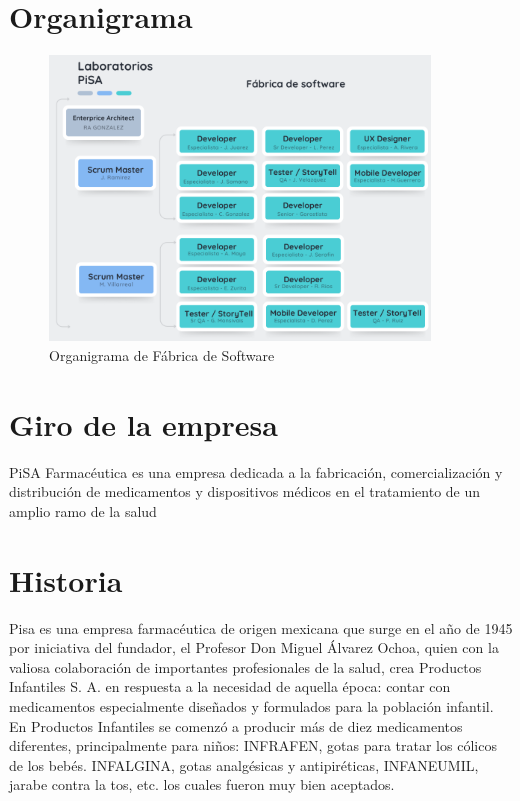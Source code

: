 \documentclass[12pt,letterpaper,spanish, xcolor=table]{report}
\numberwithin{figure}{subsection}
\begin{document}
\section{Organigrama}

\begin{figure}[H]
	\centering
	\includegraphics[width=0.9\textwidth]{Imagenes/OrganigramaPisa.png}
	\caption{Organigrama de Fábrica de Software}\label{a1}
\end{figure}
	
\section{Giro de la empresa}

PiSA Farmacéutica es una empresa dedicada a la fabricación, comercialización y distribución de medicamentos y dispositivos médicos en el tratamiento de un amplio ramo de la salud

\section{Historia}

Pisa es una empresa farmacéutica de origen mexicana que surge en el año de 1945 por iniciativa del fundador, el Profesor Don Miguel Álvarez Ochoa, quien con la valiosa colaboración de importantes profesionales de la salud, crea Productos Infantiles S. A. en respuesta a la necesidad de aquella época: contar con medicamentos especialmente diseñados y formulados para la población infantil.\\

En Productos Infantiles se comenzó a producir más de diez medicamentos diferentes, principalmente para niños: INFRAFEN, gotas para tratar los cólicos de los bebés. INFALGINA, gotas analgésicas y antipiréticas, INFANEUMIL, jarabe contra la tos, etc. los cuales fueron muy bien aceptados.\\
\end{document}
